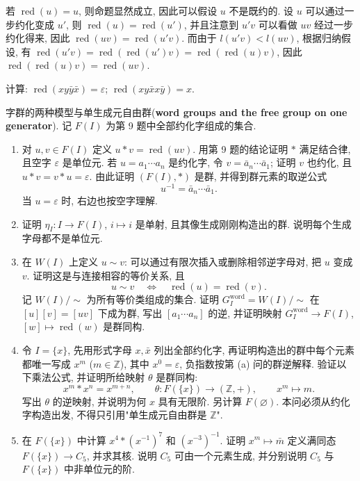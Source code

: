 \documentclass{article}
\begin{document}
\begin{solution}
	若 $\operatorname{red}(u) = u$, 则命题显然成立, 因此可以假设 $u$ 不是既约的. 设 $u$ 可以通过一步约化变成 $u'$, 则 $\operatorname{red}(u) = \operatorname{red}(u')$, 并且注意到 $u'v$ 可以看做 $uv$ 经过一步约化得来, 因此 $\operatorname{red}(uv) = \operatorname{red}(u'v)$. 而由于 $l(u'v)<l(uv)$, 根据归纳假设, 有 $\operatorname{red}(u'v) = \operatorname{red}(\operatorname{red}(u')v) = \operatorname{red}(\operatorname{red}(u) v)$, 因此 $\operatorname{red}(\operatorname{red}(u)v) = \operatorname{red}(uv)$.

	计算: $\operatorname{red}(xy\bar{y}\bar{x}) = \varepsilon$; $\operatorname{red}(xy\bar{x}x\bar{y}) = x$.
\end{solution}

\begin{problem}
  {\heiti 字群的两种模型与单生成元自由群}(\textbf{word groups and the free group on one generator}). 记 $F(I)$ 为第 9 题中全部约化字组成的集合.
  \begin{enumerate}
    \item[(a)] 对 $u,v\in F(I)$ 定义 $u*v=\operatorname{red}(uv)$. 用第 9 题的结论证明 $*$ 满足结合律, 且空字 $\varepsilon$ 是单位元. 若 $u=a_1\cdots a_n$ 是约化字, 令 $v=\bar a_n\cdots\bar a_1$; 证明 $v$ 也约化, 且 $u*v=v*u=\varepsilon$. 由此证明 $(F(I),*)$ 是群, 并得到群元素的取逆公式
      \[
        u^{-1}=\bar a_n\cdots\bar a_1.
      \]
      当 $u=\varepsilon$ 时, 右边也按空字理解.
    \item[(b)] 证明 $\eta_I:I\to F(I)$, $i\mapsto i$ 是单射, 且其像生成刚刚构造出的群. 说明每个生成字母都不是单位元.
    \item[(c)] 在 $W(I)$ 上定义 $u\sim v$: 可以通过有限次插入或删除相邻逆字母对, 把 $u$ 变成 $v$. 证明这是与连接相容的等价关系, 且
      \[
        u\sim v\quad\Longleftrightarrow\quad\operatorname{red}(u)=\operatorname{red}(v).
      \]
      记 $W(I)/{\sim}$ 为所有等价类组成的集合. 证明 $G_I^{\mathrm{word}}=W(I)/{\sim}$ 在 $[u][v]=[uv]$ 下成为群, 写出 $[a_1\cdots a_n]$ 的逆, 并证明映射 $G_I^{\mathrm{word}}\to F(I)$,$[w]\mapsto\operatorname{red}(w)$ 是群同构.
    \item[(d)] 令 $I=\{x\}$, 先用形式字母 $x,\bar x$ 列出全部约化字, 再证明构造出的群中每个元素都唯一写成 $x^m$ ($m\in\mathbb Z$), 其中 $x^0=\varepsilon$, 负指数按第 (a) 问的群逆解释. 验证以下乘法公式, 并证明所给映射 $\theta$ 是群同构:
      \[
        x^m*x^n=x^{m+n},\qquad
        \theta:F(\{x\})\longrightarrow(\mathbb Z,+),\qquad x^m\longmapsto m.
      \]
      写出 $\theta$ 的逆映射, 并说明为何 $x$ 具有无限阶. 另计算 $F(\varnothing)$. 本问必须从约化字构造出发, 不得只引用"单生成元自由群是 $\mathbb Z$".
    \item[(e)] 在 $F(\{x\})$ 中计算 $x^4*(x^{-1})^7$ 和 $(x^{-3})^{-1}$. 证明 $x^m\mapsto\bar m$ 定义满同态 $F(\{x\})\to C_5$, 并求其核. 说明 $C_5$ 可由一个元素生成, 并分别说明 $C_5$ 与 $F(\{x\})$ 中非单位元的阶.
  \end{enumerate}
\end{problem}
\end{document}
